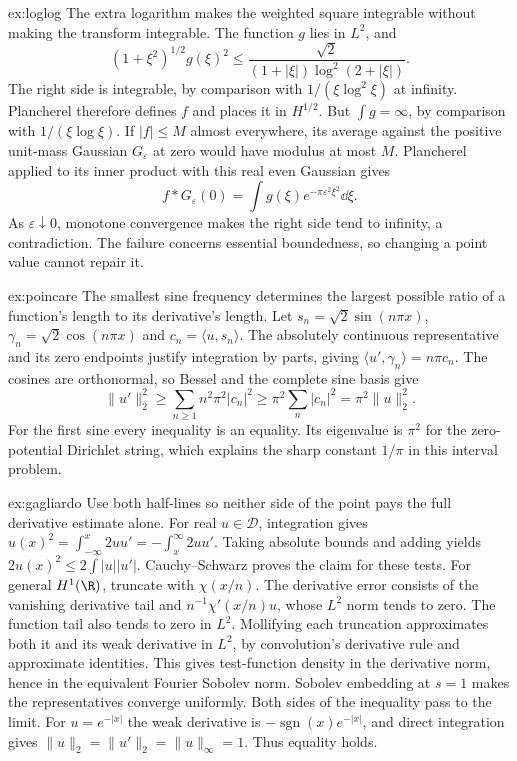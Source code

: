 \begin{solution}{ex:loglog}
\idea The extra logarithm makes the weighted square integrable without making the transform integrable.
\writeup The function $g$ lies in $L^2$, and
\[
(1+\xi^2)^{1/2}g(\xi)^2
\le\frac{\sqrt2}{(1+|\xi|)\log^2(2+|\xi|)}.
\]
The right side is integrable, by comparison with $1/(\xi\log^2\xi)$ at infinity. Plancherel therefore defines $f$ and places it in $H^{1/2}$. But $\int g=\infty$, by comparison with $1/(\xi\log\xi)$.
If $|f|\le M$ almost everywhere, its average against the positive unit-mass Gaussian $G_\varepsilon$ at zero would have modulus at most $M$. Plancherel applied to its inner product with this real even Gaussian gives
\[
f*G_\varepsilon(0)=\int g(\xi)e^{-\pi\varepsilon^2\xi^2}\dd\xi.
\]
As $\varepsilon\downarrow0$, monotone convergence makes the right side tend to infinity, a contradiction. The failure concerns essential boundedness, so changing a point value cannot repair it.
\end{solution}

\begin{solution}{ex:poincare}
\idea The smallest sine frequency determines the largest possible ratio of a function's length to its derivative's length.
\writeup Let $s_n=\sqrt2\sin(n\pi x)$, $\gamma_n=\sqrt2\cos(n\pi x)$ and $c_n=\langle u,s_n\rangle$. The absolutely continuous representative and its zero endpoints justify integration by parts, giving $\langle u',\gamma_n\rangle=n\pi c_n$. The cosines are orthonormal, so Bessel and the complete sine basis give
\[
\|u'\|_2^2\ge\sum_{n\ge1}n^2\pi^2|c_n|^2
\ge\pi^2\sum_n|c_n|^2=\pi^2\|u\|_2^2.
\]
For the first sine every inequality is an equality. Its eigenvalue is $\pi^2$ for the zero-potential Dirichlet string, which explains the sharp constant $1/\pi$ in this interval problem.
\end{solution}

\begin{solution}{ex:gagliardo}
\idea Use both half-lines so neither side of the point pays the full derivative estimate alone.
\writeup For real $u\in\mathcal D$, integration gives $u(x)^2=\int_{-\infty}^x2uu'=-\int_x^\infty2uu'$. Taking absolute bounds and adding yields $2u(x)^2\le2\int|u||u'|$. Cauchy--Schwarz proves the claim for these tests.
For general $H^1(\R)$, truncate with $\chi(x/n)$. The derivative error consists of the vanishing derivative tail and $n^{-1}\chi'(x/n)u$, whose $L^2$ norm tends to zero. The function tail also tends to zero in $L^2$. Mollifying each truncation approximates both it and its weak derivative in $L^2$, by convolution's derivative rule and approximate identities. This gives test-function density in the derivative norm, hence in the equivalent Fourier Sobolev norm. Sobolev embedding at $s=1$ makes the representatives converge uniformly. Both sides of the inequality pass to the limit.
For $u=e^{-|x|}$ the weak derivative is $-\operatorname{sgn}(x)e^{-|x|}$, and direct integration gives $\|u\|_2=\|u'\|_2=\|u\|_\infty=1$. Thus equality holds.
\end{solution}

